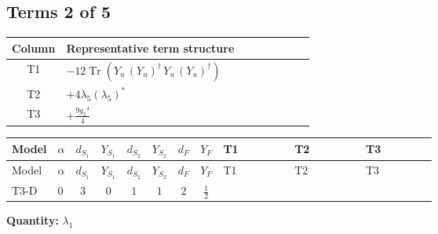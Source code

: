 \documentclass[8pt]{article}
\begin{document}
\begin{landscape}
\subsection*{Terms 2 of 5}
\begin{center}
\begin{tabular}{@{}c >{\raggedright\arraybackslash}p{0.82\linewidth}@{}}
\toprule
Column & Representative term structure \\
\midrule
T1 & \(\displaystyle -12 \operatorname{Tr}\!\left({Y_u}\,\left({Y_u}\right)^{\dagger}\,{Y_u}\,\left({Y_u}\right)^{\dagger}\right)\) \\
\midrule
T2 & \(\displaystyle +4 {\lambda_5} \left({\lambda_5}\right)^{*}\) \\
\midrule
T3 & \(\displaystyle +\frac{9 {g_2}^4}{4}\) \\
\midrule
\bottomrule
\end{tabular}
\end{center}
\smallskip
\tiny
\begin{longtable}{@{}llcccccc >{\raggedright\arraybackslash}p{0.21\linewidth} >{\raggedright\arraybackslash}p{0.21\linewidth} >{\raggedright\arraybackslash}p{0.21\linewidth}@{}}
\toprule
Model & $\alpha$ & $d_{S_1}$ & $Y_{S_1}$ & $d_{S_2}$ & $Y_{S_2}$ & $d_F$ & $Y_F$ & T1 & T2 & T3 \\
\midrule
\endfirsthead
\toprule
Model & $\alpha$ & $d_{S_1}$ & $Y_{S_1}$ & $d_{S_2}$ & $Y_{S_2}$ & $d_F$ & $Y_F$ & T1 & T2 & T3 \\
\midrule
\endhead
T3-D & $0$ & $3$ & $0$ & $1$ & $1$ & $2$ & $\frac{1}{2}$ & \scriptsize\adjustbox{max width=\linewidth}{$\begin{gathered} -12 \operatorname{Tr}\!\left({Y_u}\,\left({Y_u}\right)^{\dagger}\,{Y_u}\,\left({Y_u}\right)^{\dagger}\right)\end{gathered}$} & \scriptsize\adjustbox{max width=\linewidth}{$\begin{gathered} +4 {\lambda_5} \left({\lambda_5}\right)^{*}\end{gathered}$} & \scriptsize\adjustbox{max width=\linewidth}{$\begin{gathered} +\frac{9 {g_2}^4}{4}\end{gathered}$} \\
\midrule
\bottomrule
\end{longtable}
\clearpage
\noindent\textbf{Quantity: }$\lambda_1$\par\smallskip

\end{landscape}
\end{document}
